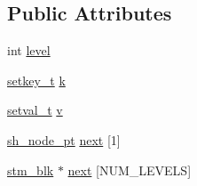 \subsection*{Public Attributes}
\begin{DoxyCompactItemize}
\item 
int \hyperlink{structnode__st_ab03fdaae977dbc619cc46b851b2ecdbf}{level}
\item 
\hyperlink{lockfreeskip_8h_a3945a06384f87c28e0642d51b0524e92}{setkey\-\_\-t} \hyperlink{structnode__st_a814e8af15def824006272679779bcbed}{k}
\item 
\hyperlink{lockfreeskip_8h_a07e25227a67b4e708996b09fd575408b}{setval\-\_\-t} \hyperlink{structnode__st_a113aa8f9a42989dce959b388411c6b0f}{v}
\item 
\hyperlink{lockfreeskip_8c_a2e54b95470140e694f7e369854761a00}{sh\-\_\-node\-\_\-pt} \hyperlink{structnode__st_a480c5a9d7c572135f47110a05395f459}{next} \mbox{[}1\mbox{]}
\item 
\hyperlink{stm_8h_a516da8305f9cec2fe40c7458fb7483e3}{stm\-\_\-blk} $\ast$ \hyperlink{structnode__st_ace3abf7f9c522a297bc22b60fbf3df9a}{next} \mbox{[}N\-U\-M\-\_\-\-L\-E\-V\-E\-L\-S\mbox{]}
\end{DoxyCompactItemize}


